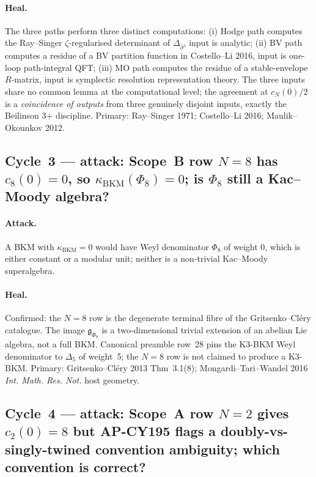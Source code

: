 \documentclass[11pt]{article}
\providecommand{\kBKM}{\kappa_{\mathrm{BKM}}}
\theoremstyle{definition}
\begin{document}
\paragraph{Heal.}
The three paths perform three distinct computations:
(i) Hodge path computes the Ray--Singer $\zeta$-regularised
determinant of $\Delta_{\bar \partial}$, input is analytic;
(ii) BV path computes a residue of a BV partition function in
Costello--Li 2016, input is one-loop path-integral QFT;
(iii) MO path computes the residue of a stable-envelope $R$-matrix,
input is symplectic resolution representation theory.
The three inputs share no common lemma at the computational level;
the agreement at $c_N(0)/2$ is a \emph{coincidence of outputs} from
three genuinely disjoint inputs, exactly the Beilinson 3+ discipline.
Primary: Ray--Singer 1971; Costello--Li 2016; Maulik--Okounkov 2012.

\subsection{Cycle~3 --- attack: Scope~B row $N = 8$ has $c_8(0) = 0$,
so $\kBKM(\Phi_8) = 0$; is $\Phi_8$ still a Kac--Moody algebra?}

\paragraph{Attack.}
A BKM with $\kBKM = 0$ would have Weyl denominator $\Phi_8$ of
weight $0$, which is either constant or a modular unit; neither is
a non-trivial Kac--Moody superalgebra.

\paragraph{Heal.}
Confirmed: the $N = 8$ row is the degenerate terminal fibre of the
Gritsenko--Cl\'ery catalogue. The image
$\mathfrak g_{\Phi_8}$ is a two-dimensional trivial extension of an
abelian Lie algebra, not a full BKM. Canonical preamble row~28 pins
the K3-BKM Weyl denominator to $\Delta_5$ of weight~5; the $N = 8$
row is not claimed to produce a K3-BKM. Primary: Gritsenko--Cl\'ery
2013 Thm~3.1(8); Mongardi--Tari--Wandel 2016 \emph{Int. Math. Res.
Not.} host geometry.

\subsection{Cycle~4 --- attack: Scope~A row $N = 2$ gives
$c_2(0) = 8$ but AP-CY195 flags a doubly-vs-singly-twined convention
ambiguity; which convention is correct?}
\end{document}
